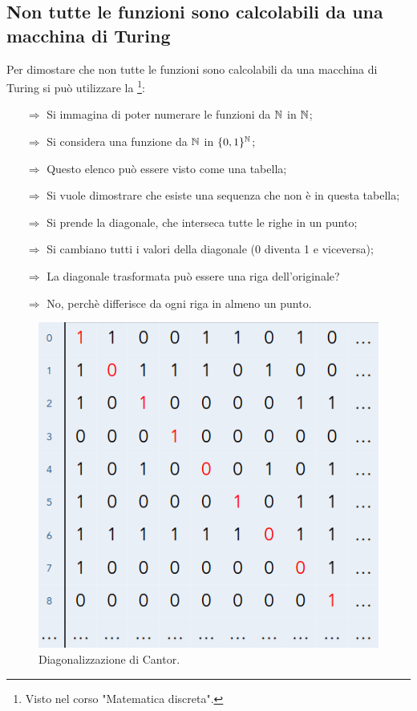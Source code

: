 

\subsection{Non tutte le funzioni sono calcolabili da una macchina di Turing}

Per dimostare che non tutte le funzioni sono calcolabili da una macchina di Turing  si può
utilizzare la \footnote{Visto nel corso "Matematica discreta".}:
\begin{itemize}
    \item [$\Rightarrow$] Si immagina di poter numerare le funzioni da $\mathbb{N}$ in $\mathbb{N}$;
    \item [$\Rightarrow$] Si considera una funzione da $\mathbb{N}$ in $\{0,1\}^{\mathbb{N}}$;
    \item [$\Rightarrow$] Questo elenco può essere visto come una tabella;
    \item [$\Rightarrow$] Si vuole dimostrare che esiste una sequenza che non è in questa tabella;
    \item [$\Rightarrow$] Si prende la diagonale, che interseca tutte le righe in un punto;
    \item [$\Rightarrow$] Si cambiano tutti i valori della diagonale (0 diventa 1 e viceversa);
    \item [$\Rightarrow$] La diagonale trasformata può essere una riga dell'originale?
    \item [$\Rightarrow$] No, perchè differisce da ogni riga in almeno un punto.
\end{itemize}

\begin{figure}[h]
    \centering
    \includegraphics[scale = 0.38]{images/Diagonalizzazione.png}
    \caption{Diagonalizzazione di Cantor.}
\end{figure}

